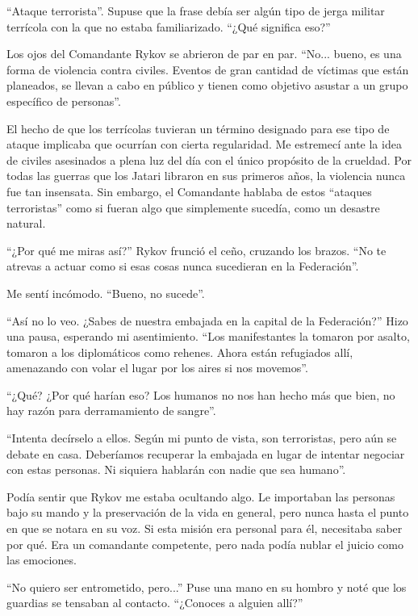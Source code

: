 \documentclass[spanish,12pt,a4paper,oneside,titlepage]{book}
\begin{document}
    ``Ataque terrorista''. Supuse que la frase debía ser algún tipo de jerga militar terrícola con la que no estaba familiarizado. ``¿Qué significa eso?''

    Los ojos del Comandante Rykov se abrieron de par en par. ``No... bueno, es una forma de violencia contra civiles. Eventos de gran cantidad de víctimas que están planeados, se llevan a cabo en público y tienen como objetivo asustar a un grupo específico de personas''.

    El hecho de que los terrícolas tuvieran un término designado para ese tipo de ataque implicaba que ocurrían con cierta regularidad. Me estremecí ante la idea de civiles asesinados a plena luz del día con el único propósito de la crueldad. Por todas las guerras que los Jatari libraron en sus primeros años, la violencia nunca fue tan insensata. Sin embargo, el Comandante hablaba de estos ``ataques terroristas'' como si fueran algo que simplemente sucedía, como un desastre natural.

    ``¿Por qué me miras así?'' Rykov frunció el ceño, cruzando los brazos. ``No te atrevas a actuar como si esas cosas nunca sucedieran en la Federación''.

    Me sentí incómodo. ``Bueno, no sucede''.

    ``Así no lo veo. ¿Sabes de nuestra embajada en la capital de la Federación?'' Hizo una pausa, esperando mi asentimiento. ``Los manifestantes la tomaron por asalto, tomaron a los diplomáticos como rehenes. Ahora están refugiados allí, amenazando con volar el lugar por los aires si nos movemos''.

    ``¿Qué? ¿Por qué harían eso? Los humanos no nos han hecho más que bien, no hay razón para derramamiento de sangre''.

    ``Intenta decírselo a ellos. Según mi punto de vista, son terroristas, pero aún se debate en casa. Deberíamos recuperar la embajada en lugar de intentar negociar con estas personas. Ni siquiera hablarán con nadie que sea humano''.

    Podía sentir que Rykov me estaba ocultando algo. Le importaban las personas bajo su mando y la preservación de la vida en general, pero nunca hasta el punto en que se notara en su voz. Si esta misión era personal para él, necesitaba saber por qué. Era un comandante competente, pero nada podía nublar el juicio como las emociones.

    ``No quiero ser entrometido, pero...'' Puse una mano en su hombro y noté que los guardias se tensaban al contacto. ``¿Conoces a alguien allí?''
\end{document}
